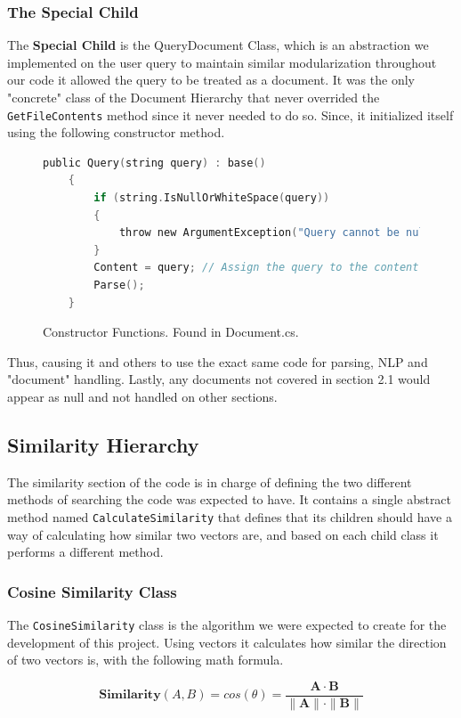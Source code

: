 \documentclass{article}
\begin{document}
\subsubsection{The Special Child}
The \textbf{Special Child} is the QueryDocument Class, which is an abstraction we implemented on the user query to maintain similar modularization throughout 
our code it allowed the query to be treated as a document. It was the only "concrete" class of the Document Hierarchy that never overrided the \texttt{GetFileContents}
method since it never needed to do so. Since, it initialized itself using the following constructor method.
\begin{figure}[H]
    \begin{lstlisting}[language=C]
    public Query(string query) : base()
    {
        if (string.IsNullOrWhiteSpace(query))
        {
            throw new ArgumentException("Query cannot be null or empty.");
        }   
        Content = query; // Assign the query to the content
        Parse();
    }
    \end{lstlisting}
    \caption{Constructor Functions. Found in Document.cs.}
    \label{fig:Constructor2}
\end{figure}
Thus, causing  it and others to use the exact same code for parsing, 
NLP and "document" handling. Lastly, any documents not covered in section 2.1
would appear as null and not handled on other sections.

\subsection{Similarity Hierarchy}
The similarity section of the code is in charge of defining the two different methods of searching the code was expected to have. It contains a single abstract method named \texttt{CalculateSimilarity} that defines that its children should have a way of calculating how similar two vectors are, and based on each child class it performs a different method.
\subsubsection{Cosine Similarity Class}
The \texttt{CosineSimilarity} class is the algorithm we were expected to create for the development of this project. Using vectors it calculates how similar the direction of two vectors is, with the following math formula.

\begin{center}
    \[
        \textbf{Similarity}(A, B) = cos(\theta) = \frac{\mathbf{A} \cdot \mathbf{B}}{\|\mathbf{A}\| \cdot \|\mathbf{B}\|}
    \]
\end{center}
\end{document}
